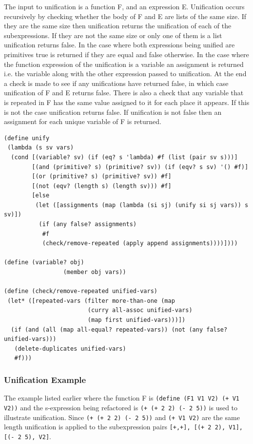 \documentclass[a4paper,10pt]{article}
\begin{document}
The input to unification is a function F, and an expression E.  Unification occurs recursively by checking whether the body of F and E are lists of the same size.  If they are the same size then unification returns the unification of each of the subexpressions.  If they are not the same size or only one of them is a list unification returns false.  In the case where both expressions being unified are primitives true is returned if they are equal and false otherwise.  In the case where the function expression of the unification is a variable an assignment is returned i.e. the variable along with the other expression passed to unification.  At the end a check is made to see if any unifications have returned false, in which case unification of F and E returns false.  There is also a check that any variable that is repeated in F has the same value assigned to it for each place it appears.  If this is not the case unification returns false. If unification is not false then an assignment for each unique variable of F is returned.

\begin{lstlisting}[frame=trBL]
(define unify
 (lambda (s sv vars)
  (cond [(variable? sv) (if (eq? s 'lambda) #f (list (pair sv s)))]
        [(and (primitive? s) (primitive? sv)) (if (eqv? s sv) '() #f)]
        [(or (primitive? s) (primitive? sv)) #f]
        [(not (eqv? (length s) (length sv))) #f]
        [else
         (let ([assignments (map (lambda (si sj) (unify si sj vars)) s sv)])
          (if (any false? assignments)
           #f
           (check/remove-repeated (apply append assignments))))])))

(define (variable? obj)
                 (member obj vars))

(define (check/remove-repeated unified-vars)
 (let* ([repeated-vars (filter more-than-one (map 
                        (curry all-assoc unified-vars) 
                        (map first unified-vars)))])
  (if (and (all (map all-equal? repeated-vars)) (not (any false? unified-vars)))
   (delete-duplicates unified-vars)
   #f)))
\end{lstlisting}
\subsubsection{Unification Example}
The example listed earlier where the function F is \texttt{(define (F1 V1 V2) (+ V1 V2))} and the s-expression being refactored is \texttt{(+ (+ 2 2) (- 2 5))} is used to illustrate unification.  Since \texttt{(+ (+ 2 2) (- 2 5))} and \texttt{(+ V1 V2)} are the same length unification is applied to the subexpression pairs \texttt{[+,+], [(+ 2 2), V1], [(- 2 5), V2]}.
\end{document}
